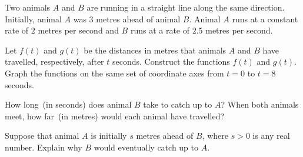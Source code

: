 \documentclass[a4paper,oneside,12pt]{article}
\begin{document}
\begin{problem}
\item Two animals $A$ and $B$ are running in a straight line along the
  same direction.  Initially, animal $A$ was $3$ metres ahead of
  animal $B$.  Animal $A$ runs at a constant rate of $2$ metres per
  second and $B$ runs at a rate of $2.5$ metres per second.
  \begin{packedenum}
  \item\label{subprob:rat_race_linear_functions}
    Let $f(t)$ and $g(t)$ be the distances in metres that animals $A$
    and $B$ have travelled, respectively, after $t$ seconds.
    Construct the functions $f(t)$ and $g(t)$.  Graph the functions on
    the same set of coordinate axes from $t = 0$ to $t = 8$ seconds.

  \item\label{subprob:rat_race_catch_up}
    How long~(in seconds) does animal $B$ take to catch up to $A$?
    When both animals meet, how far~(in metres) would each animal have
    travelled?

  \item\label{subprob:rat_race_any_head_start}
    Suppose that animal $A$ is initially $s$ metres ahead of $B$,
    where $s > 0$ is any real number.  Explain why $B$ would
    eventually catch up to $A$.
  \end{packedenum}
\end{problem}
\end{document}
